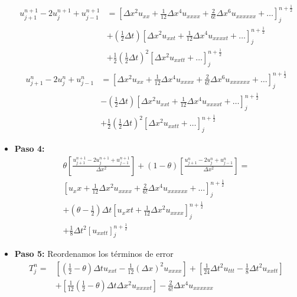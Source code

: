 \begin{itemize}
	\begin{align*}
		u_{j+1}^{n+1} -2u_{j}^{n+1} + u_{j-1}^{n+1} & = \left[\Delta x ^2 u_{xx} + \frac{1}{12}\Delta x ^4 u_{xxxx} + \frac{2}{6!}\Delta x^6 u_{xxxxxx}+\hdots \right]_j^{n+\frac{1}{2}}\\
		& + \left(\frac{1}{2}\Delta t\right) \left[\Delta x ^2 u_{xxt} + \frac{1}{12}\Delta x ^4 u_{xxxxt} +\hdots \right]_j^{n+\frac{1}{2}}\\
		& + \frac{1}{2}\left(\frac{1}{2}\Delta t\right)^2 \left[\Delta x ^2 u_{xxtt} + \hdots \right]_j^{n+\frac{1}{2}}
	\end{align*}
	\begin{align*}
		u_{j+1}^{n} -2u_{j}^{n} + u_{j-1}^{n} & = \left[\Delta x ^2 u_{xx} + \frac{1}{12}\Delta x ^4 u_{xxxx} + \frac{2}{6!}\Delta x^6 u_{xxxxxx}+\hdots \right]_j^{n+\frac{1}{2}}\\
		& - \left(\frac{1}{2}\Delta t\right) \left[\Delta x ^2 u_{xxt} + \frac{1}{12}\Delta x ^4 u_{xxxxt} +\hdots \right]_j^{n+\frac{1}{2}}\\
		& + \frac{1}{2}\left(\frac{1}{2}\Delta t\right)^2 \left[\Delta x ^2 u_{xxtt} + \hdots \right]_j^{n+\frac{1}{2}}
	\end{align*}

	\item \textbf{Paso 4: }
	\begin{align*}
	\theta\left[\frac{u_{j+1}^{n+1}-2u_{j}^{n+1}+u_{j-1}^{n+1}}{\Delta x ^2}\right] + (1 - \theta) \left[\frac{u_{j+1}^{n}-2u_{j}^{n}+u_{j-1}^{n}}{\Delta x ^2}\right] = \\
	\left[u_xx + \frac{1}{12}\Delta x^2 u_{xxxx} + \frac{2}{6!}\Delta x ^4 u_{xxxxxx}  + \hdots\right]_j^{n+\frac{1}{2}}\\
	+(\theta - \frac{1}{2})\Delta t \left[u_xxt + \frac{1}{12}\Delta x ^2 u_{xxxx}\right]_j^{n+\frac{1}{2}}\\
	+\frac{1}{8}\Delta t ^2\left[u_{xxtt}\right]_j^{n+\frac{1}{2}}
	\end{align*}
	
	\item \textbf{Paso 5: }	Reordenamos los términos de error
	\begin{align*}
	T_j^n = & \left[\left(\frac{1}{2}-\theta\right)\Delta t u_{xxt}- \frac{1}{12}(\Delta x)^2 u_{xxxx}\right]
	+ \left[\frac{1}{24}\Delta t^2 u_{ttt}-\frac{1}{8}\Delta t ^2 u_{xxtt}\right]\\
	& + \left[\frac{1}{12}\left(\frac{1}{2}-\theta\right)\Delta t \Delta x^2 u_{xxxxt}\right] - \frac{2}{6!}\Delta x ^4 u_{xxxxxx}
	\end{align*}

\end{itemize}

